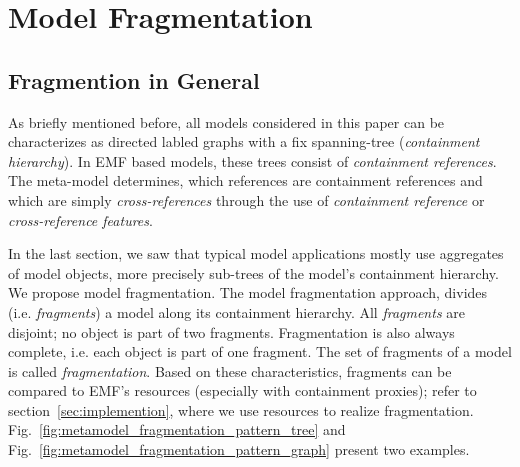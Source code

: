 \section{Model Fragmentation}
\label{sec:fragmentation}

\subsection{Fragmention in General}
As briefly mentioned before, all models considered in this paper can be characterizes as directed labled graphs with a fix spanning-tree (\emph{containment hierarchy}). In EMF based models, these trees consist of \emph{containment references}. The meta-model determines, which references are containment references and which are simply \emph{cross-references} through the use of \emph{containment reference} or \emph{cross-reference features}.

In the last section, we saw that typical model applications mostly use aggregates of model objects, more precisely sub-trees of the model's containment hierarchy. We propose model fragmentation. The model fragmentation approach, divides (i.e. \emph{fragments}) a model along its containment hierarchy. All \emph{fragments} are disjoint; no object is part of two fragments. Fragmentation is also always complete, i.e. each object is part of one fragment. The set of fragments of a model is called \emph{fragmentation}. Based on these characteristics, fragments can be compared to EMF's resources (especially with containment proxies); refer to section~\ref{sec:implemention}, where we use resources to realize fragmentation. Fig.~\ref{fig:metamodel_fragmentation_pattern_tree} and Fig.~\ref{fig:metamodel_fragmentation_pattern_graph} present two examples.



